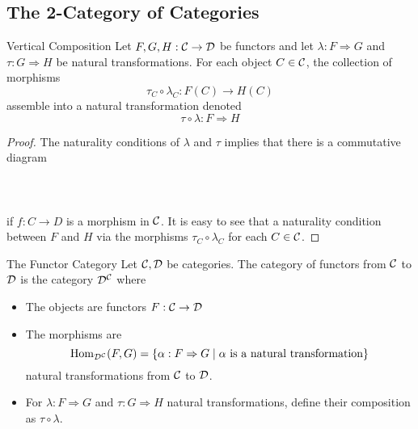 \documentclass[a4paper]{article}
\begin{document}
\subsection{The 2-Category of Categories}
\begin{prp}{Vertical Composition}{} Let $F,G,H:\mathcal{C}\to\mathcal{D}$ be functors and let $\lambda:F\Rightarrow G$ and $\tau:G\Rightarrow H$ be natural transformations. For each object $C\in\mathcal{C}$, the collection of morphisms $$\tau_C\circ\lambda_C:F(C)\to H(C)$$ assemble into a natural transformation denoted $$\tau\circ\lambda:F\Rightarrow H$$ \tcbline
\begin{proof}
The naturality conditions of $\lambda$ and $\tau$ implies that there is a commutative diagram \\~\\
\\~\\
if $f:C\to D$ is a morphism in $\mathcal{C}$. It is easy to see that a naturality condition between $F$ and $H$ via the morphisms $\tau_C\circ\lambda_C$ for each $C\in\mathcal{C}$. 
\end{proof}
\end{prp}

\begin{defn}{The Functor Category}{} Let $\mathcal{C},\mathcal{D}$ be categories. The category of functors from $\mathcal{C}$ to $\mathcal{D}$ is the category $\mathcal{D}^{\mathcal{C}}$ where
\begin{itemize}
\item The objects are functors $F:\mathcal{C}\to\mathcal{D}$
\item The morphisms are $$\operatorname{Hom}_{\mathcal{D}^{\mathcal{C}}}(F,G)=\{\alpha:F\Rightarrow G\;|\;\alpha\text{ is a natural transformation}\}$$ natural transformations from $\mathcal{C}$ to $\mathcal{D}$. 
\item For $\lambda:F\Rightarrow G$ and $\tau:G\Rightarrow H$ natural transformations, define their composition as $\tau\circ\lambda$. 
\end{itemize}
\end{defn}
\end{document}
